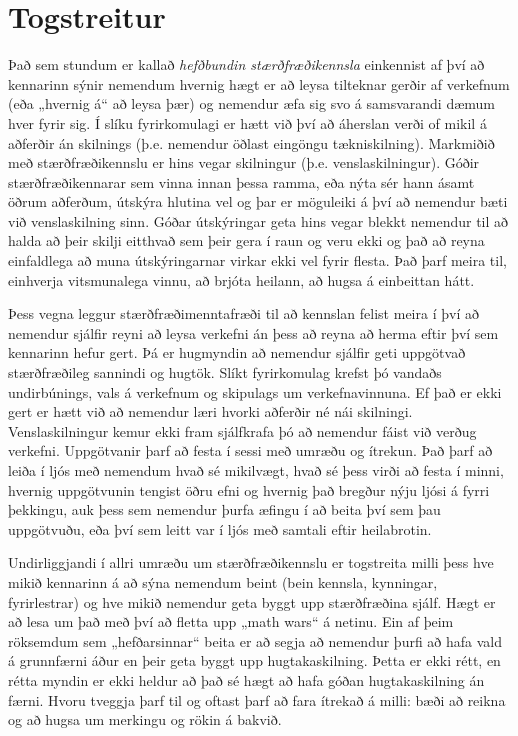 \documentclass[
  icelandic,
]{book}
\begin{document}
\section{Togstreitur}\label{togstreitur}

Það sem stundum er kallað \emph{hefðbundin stærðfræðikennsla} einkennist af því að kennarinn sýnir nemendum hvernig hægt er að leysa tilteknar gerðir af verkefnum (eða „hvernig á`` að leysa þær) og nemendur æfa sig svo á samsvarandi dæmum hver fyrir sig. Í slíku fyrirkomulagi er hætt við því að áherslan verði of mikil á aðferðir án skilnings (þ.e. nemendur öðlast eingöngu tækniskilning). Markmiðið með stærðfræðikennslu er hins vegar skilningur (þ.e. venslaskilningur). Góðir stærðfræðikennarar sem vinna innan þessa ramma, eða nýta sér hann ásamt öðrum aðferðum, útskýra hlutina vel og þar er möguleiki á því að nemendur bæti við venslaskilning sinn. Góðar útskýringar geta hins vegar blekkt nemendur til að halda að þeir skilji eitthvað sem þeir gera í raun og veru ekki og það að reyna einfaldlega að muna útskýringarnar virkar ekki vel fyrir flesta. Það þarf meira til, einhverja vitsmunalega vinnu, að brjóta heilann, að hugsa á einbeittan hátt.

Þess vegna leggur stærðfræðimenntafræði til að kennslan felist meira í því að nemendur sjálfir reyni að leysa verkefni án þess að reyna að herma eftir því sem kennarinn hefur gert. Þá er hugmyndin að nemendur sjálfir geti uppgötvað stærðfræðileg sannindi og hugtök. Slíkt fyrirkomulag krefst þó vandaðs undirbúnings, vals á verkefnum og skipulags um verkefnavinnuna. Ef það er ekki gert er hætt við að nemendur læri hvorki aðferðir né nái skilningi. Venslaskilningur kemur ekki fram sjálfkrafa þó að nemendur fáist við verðug verkefni. Uppgötvanir þarf að festa í sessi með umræðu og ítrekun. Það þarf að leiða í ljós með nemendum hvað sé mikilvægt, hvað sé þess virði að festa í minni, hvernig uppgötvunin tengist öðru efni og hvernig það bregður nýju ljósi á fyrri þekkingu, auk þess sem nemendur þurfa æfingu í að beita því sem þau uppgötvuðu, eða því sem leitt var í ljós með samtali eftir heilabrotin.

Undirliggjandi í allri umræðu um stærðfræðikennslu er togstreita milli þess hve mikið kennarinn á að sýna nemendum beint (bein kennsla, kynningar, fyrirlestrar) og hve mikið nemendur geta byggt upp stærðfræðina sjálf. Hægt er að lesa um það með því að fletta upp „math wars`` á netinu. Ein af þeim röksemdum sem „hefðarsinnar`` beita er að segja að nemendur þurfi að hafa vald á grunnfærni áður en þeir geta byggt upp hugtakaskilning. Þetta er ekki rétt, en rétta myndin er ekki heldur að það sé hægt að hafa góðan hugtakaskilning án færni. Hvoru tveggja þarf til og oftast þarf að fara ítrekað á milli: bæði að reikna og að hugsa um merkingu og rökin á bakvið.
\end{document}
